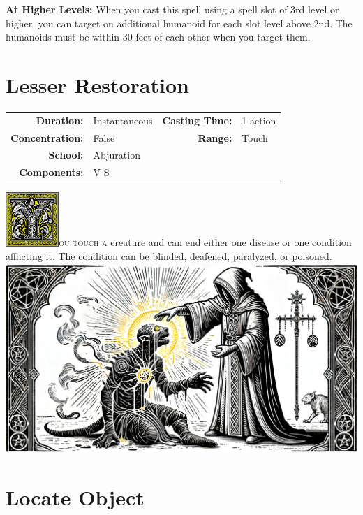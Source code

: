 \documentclass[12pt,showtrims]{memoir}
\begin{document}
\vspace{8pt} \noindent\textbf{At Higher Levels:} When you cast this spell using a spell slot of 3rd level or higher, you can target on additional humanoid for each slot level above 2nd. The humanoids must be within 30 feet of each other when you target them.
\newpage

\section*{Lesser Restoration}
{
\small\centering\vspace{-6pt}
\begin{tabular}{rlrl}
\toprule

\textbf{Duration:} & Instantaneous &
\textbf{Casting Time:} & 1 action \\
\textbf{Concentration:} & False &
\textbf{Range:} & Touch \\
\textbf{School:} & Abjuration \\
\textbf{Components:} & \multicolumn{3}{p{0.7\textwidth}}{V S}\\

\bottomrule
\end{tabular}
}
\vspace{1\baselineskip}\noindent 
\lettrine[lines=4]{\includegraphics[height=58pt]{initials/Y.png}}{ou touch a} creature and can end either one disease or one condition afflicting it. The condition can be blinded, deafened, paralyzed, or poisoned.
\vfill\vfill
\noindent
\includegraphics[width=\textwidth]{spell_artwork/lesser_restoration.png}
\vfill
\newpage
\section*{Locate Object}
\end{document}

